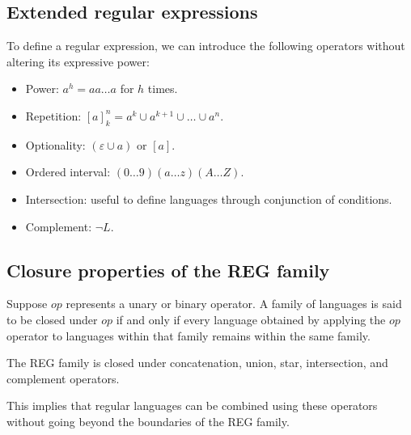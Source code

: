 \subsection*{Extended regular expressions}
To define a regular expression, we can introduce the following operators without altering its expressive power: 
\begin{itemize}
    \item Power: $a^h=aa\dots a$ for $h$ times. 
    \item Repetition: $[a]^n_k=a^k \cup a^{k+1} \cup \dots \cup a^n$.
    \item Optionality: $(\varepsilon \cup a)$ or $[a]$.
    \item Ordered interval: $(0\dots 9)(a \dots z)(A \dots Z)$.
    \item Intersection: useful to define languages through conjunction of conditions. 
    \item Complement: $\lnot L$.
\end{itemize}

\subsection*{Closure properties of the REG family}
\begin{definition}
    Suppose $op$ represents a unary or binary operator.
    A family of languages is said to be closed under $op$ if and only if every language obtained by applying the $op$ operator to languages within that family remains within the same family.
\end{definition}
\begin{property}
    The REG family is closed under concatenation, union, star, intersection, and complement operators. 
\end{property}
This implies that regular languages can be combined using these operators without going beyond the boundaries of the REG family.